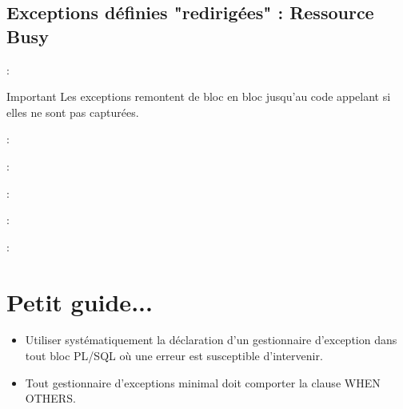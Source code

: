 \documentclass[10pt]{beamer}
\begin{document}
\subsection{Exceptions définies "redirigées" : Ressource Busy}
\begin{frame}{\secname : \subsecname}
    \begin{alertblock}{Important}
        Les exceptions remontent de bloc en bloc jusqu'au code appelant si elles ne sont pas capturées.
    \end{alertblock}
\end{frame}

\begin{frame}{\secname : \subsecname}
    
\end{frame}

\begin{frame}{\secname : \subsecname}
    
\end{frame}

\begin{frame}{\secname : \subsecname}
    
\end{frame}

\begin{frame}{\secname : \subsecname}
    
\end{frame}

\begin{frame}{\secname : \subsecname}
    
\end{frame}

\section{Petit guide...}
\begin{frame}{\secname}
    \begin{itemize}
        \item Utiliser systématiquement la déclaration d'un gestionnaire d'exception dans tout bloc PL/SQL où une erreur est susceptible d'intervenir.
        \item Tout gestionnaire d'exceptions minimal doit comporter la clause WHEN OTHERS.
    \end{itemize}
\end{frame}
\end{document}
